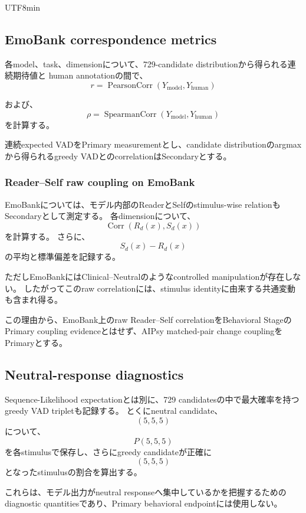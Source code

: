 \documentclass{article} %
\begin{document}
\begin{CJK*}{UTF8}{min}
\subsection{EmoBank correspondence metrics}

各model、task、dimensionについて、729-candidate distributionから得られる連続期待値と
human annotationの間で、
\[
r
=
\operatorname{PearsonCorr}
(
Y_{\mathrm{model}},
Y_{\mathrm{human}}
)
\]

および、
\[
\rho
=
\operatorname{SpearmanCorr}
(
Y_{\mathrm{model}},
Y_{\mathrm{human}}
)
\]
を計算する。

連続expected VADをPrimary measurementとし、candidate distributionのargmaxから得られるgreedy VADとのcorrelationはSecondaryとする。



\subsubsection{Reader--Self raw coupling on EmoBank}

EmoBankについては、モデル内部のReaderとSelfのstimulus-wise relationもSecondaryとして測定する。
各dimensionについて、
\[
\operatorname{Corr}
(
R_d(x),
S_d(x)
)
\]
を計算する。
さらに、
\[
S_d(x)-R_d(x)
\]
の平均と標準偏差を記録する。

ただしEmoBankにはClinical--Neutralのようなcontrolled manipulationが存在しない。
したがってこのraw correlationには、stimulus identityに由来する共通変動も含まれ得る。

この理由から、EmoBank上のraw Reader--Self correlationをBehavioral StageのPrimary coupling evidenceとはせず、AIPsy matched-pair change couplingをPrimaryとする。


\subsection{Neutral-response diagnostics}

Sequence-Likelihood expectationとは別に、729 candidatesの中で最大確率を持つgreedy VAD tripletも記録する。
とくにneutral candidate、
\[
(5,5,5)
\]
について、
\[
P(5,5,5)
\]
を各stimulusで保存し、さらにgreedy candidateが正確に
\[
(5,5,5)
\]
となったstimulusの割合を算出する。

これらは、モデル出力がneutral responseへ集中しているかを把握するためのdiagnostic quantitiesであり、Primary behavioral endpointには使用しない。



\end{CJK*}
\end{document}
